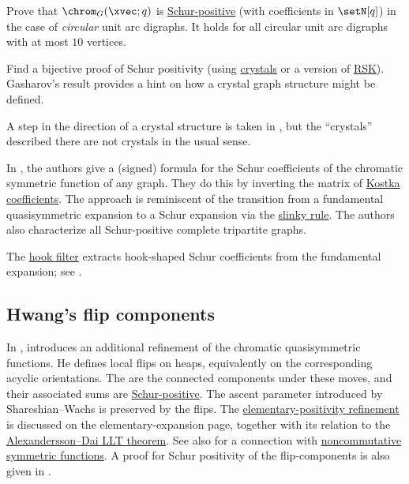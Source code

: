 \begin{problem}
Prove that $\chrom_G(\xvec;q)$ is
\hyperref[schurPositiveDefinition]{Schur-positive} (with coefficients in $\setN[q]$)
in the case of \emph{circular} unit arc digraphs.
It holds for all circular unit arc digraphs with at most $10$ vertices.

Find a bijective proof of Schur positivity (using \hyperref[schurPositivityCrystals]{crystals} or
a version of \hyperref[schurPositivityRSK]{RSK}).
Gasharov's result provides a hint on how a crystal graph structure might be defined.

A step in the direction of a crystal structure is taken in \cite{Ehrhard2022x},
but the \enquote{crystals} described there are not crystals in the usual sense.
\end{problem}


In \cite{WangWang2020}, the authors give a (signed) formula
for the Schur coefficients of the chromatic symmetric function of any graph.
They do this by inverting the matrix of
\hyperref[kostkaCoefficient]{Kostka coefficients}.
The approach is reminiscent of the transition from a fundamental
quasisymmetric expansion to a Schur expansion via the
\hyperref[gesselSlinkyRule]{slinky rule}.
The authors also characterize all Schur-positive complete tripartite graphs.

The \hyperref[def:hookFilter]{hook filter} extracts hook-shaped Schur
coefficients from the fundamental expansion; see \cite{Stanley1995}.


\subsection[chromaticFlipRefinement]{Hwang's flip components}

In \cite{Hwang2022x},  introduces an
additional refinement of the chromatic quasisymmetric functions.
He defines local flips on heaps, equivalently on the corresponding acyclic
orientations.  The \label{chromaticFlipComponents} are
the connected components under these moves, and their associated sums are
\hyperref[schurPositiveDefinition]{Schur-positive}.  The ascent parameter
introduced by Shareshian--Wachs is preserved by the flips.
The \hyperref[chromaticEFlipComponents]{elementary-positivity refinement}
is discussed on the elementary-expansion page, together with its relation to
the \hyperref[unicellularLLTFlipClassExpansion]{Alexandersson--Dai LLT theorem}.
See also \cite{Hwang2023x} for a connection with
\hyperref[nonComFunctions]{noncommutative symmetric functions}.
A proof for Schur positivity of the flip-components is also given in
\cite{BlasiakErikssonPylyavskyySiegl2022x}.


